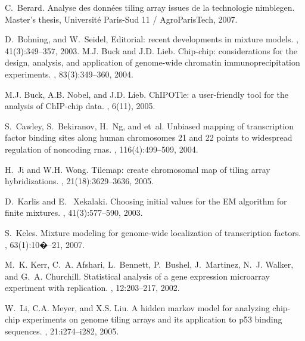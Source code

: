 \documentclass{bioinfo}
\begin{document}

\begin{thebibliography}{}
C.~Berard.
\newblock Analyse des donn\'ees tiling array issues de la technologie
  nimblegen.
\newblock Master's thesis, Universit\'e Paris-Sud 11 / AgroParisTech, 2007.

D.~Bohning, and W.~Seidel,
\newblock Editorial: recent developments in mixture models.
, 41(3):349--357, 2003.
M.J. Buck and J.D. Lieb.
\newblock Chip-chip: considerations for the design, analysis, and application
  of genome-wide chromatin immunoprecipitation experiments.
, 83(3):349--360, 2004.

M.J. Buck, A.B. Nobel, and J.D. Lieb.
\newblock Ch{IPOT}le: a user-friendly tool for the analysis of {C}h{IP}-chip
  data.
, 6(11), 2005.

S.~Cawley, S.~Bekiranov, H.~Ng, and et~al.
\newblock Unbiased mapping of transcription factor binding sites along human
  chromosomes 21 and 22 points to widespread regulation of noncoding rnas.
, 116(4):499--509, 2004.

H.~Ji and W.H. Wong.
\newblock Tilemap: create chromosomal map of tiling array hybridizations.
, 21(18):3629--3636, 2005.

D.~Karlis and E.~ Xekalaki.
\newblock Choosing initial values for the EM algorithm for finite mixtures.
, 41(3):577--590, 2003.

S.~Keles.
\newblock Mixture modeling for genome-wide localization of transcription
  factors.
, 63(1):10�--21, 2007.

M.~K. Kerr, C.~A. Afshari, L.~Bennett, P.~Bushel, J.~Martinez, N.~J. Walker,
  and G.~A. Churchill.
\newblock Statistical analysis of a gene expression microarray experiment with
  replication.
, 12:203--217, 2002.

W.~Li, C.A. Meyer, and X.S. Liu.
\newblock A hidden markov model for analyzing chip-chip experiments on genome
  tiling arrays and its application to p53 binding sequences.
, 21:i274--i282, 2005.


\end{thebibliography}
\end{document}
